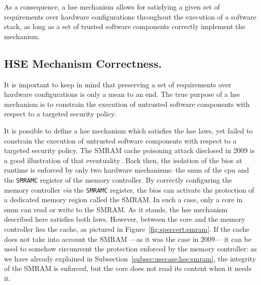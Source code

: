 As a consequence, a \ac{hse} mechanism allows for satisfying a given set of
requirements over hardware configurations throughout the execution of a software
stack, as long as a set of trusted software components correctly implement the
mechanism.

\subsection{HSE Mechanism Correctness.}
\label{subsec:speccert:security}

It is important to keep in mind that preserving a set of requirements over
hardware configurations is only a mean to an end.
%
The true purpose of a \ac{hse} mechanism is to constrain the execution of
untrusted software components with respect to a targeted security policy.

It is possible to define a \ac{hse} mechanism which satisfies the \ac{hse} laws,
yet failed to constrain the execution of untrusted software components with
respect to a targeted security policy.
%
The SMRAM cache poisoning attack disclosed in 2009 is a good illustration of
that eventuality\,\cite{duflot2009smram,wojtczuk2009smram}.
%
Back then, the isolation of the \ac{bios} at runtime is enforced by only two
hardware mechanisms: the \ac{smm} of the \ac{cpu} and the \texttt{SMRAMC}
register of the memory controller.
%
By correctly configuring the memory controller \emph{via} the \texttt{SMRAMC}
register, the \ac{bios} can activate the protection of a dedicated memory region
called the SMRAM.
%
In such a case, only a core in \ac{smm} can read or write to the SMRAM.
%
As it stands, the \ac{hse} mechanism described here satisfies both laws.
%
However, between the core and the memory controller lies the cache, as pictured
in Figure~\ref{fig:speccert:smram}.
%
If the cache does not take into account the SMRAM ---as it was the case in
2009--- it can be used to somehow circumvent the protection enforced by the
memory controller: as we have already explained in
Subsection~\ref{subsec:usecase:hse:smram}, the integrity of the SMRAM is
enforced, but the core does not read its content when it needs it.

